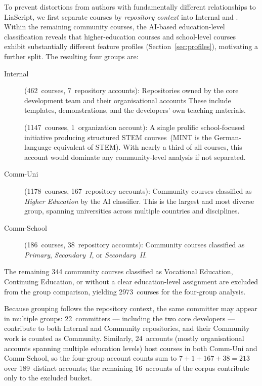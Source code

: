 To prevent distortions from authors with fundamentally different
relationships to LiaScript, we first separate courses by
\emph{repository context} into Internal and \mintgroup.
Within the remaining community courses, the AI-based education-level
classification reveals that higher-education courses and school-level
courses exhibit substantially different feature profiles
(Section~\ref{sec:profiles}), motivating a further split.
The resulting four groups are:
\begin{description}
  \item[Internal] (462~courses, 7~repository accounts):
    Repositories owned by the core development team and their
    organisational accounts
    These include templates, demonstrations, and the developers' own
    teaching materials.
  \item[\mintgroup] (\num{1147}~courses, 1~organization account):
    A single prolific school-focused initiative producing structured
    STEM courses\ifanonymous\else~(MINT is the German-language
    equivalent of STEM)\fi.
    With nearly a third of all courses, this account would dominate any
    community-level analysis if not separated.
  \item[Comm-Uni] (\num{1178}~courses, 167~repository accounts):
    Community courses classified as \emph{Higher Education} by the
    AI classifier.
    This is the largest and most diverse group, spanning universities
    across multiple countries and disciplines.
  \item[Comm-School] (186~courses, 38~repository accounts):
    Community courses classified as \emph{Primary}, \emph{Secondary~I},
    or \emph{Secondary~II}.
\end{description}

\noindent
The remaining \num{344} community courses classified as Vocational
Education, Continuing Education, or without a clear education-level
assignment are excluded from the group comparison, yielding
\num{2973}~courses for the four-group analysis.

Because grouping follows the repository context, the same committer
may appear in multiple groups: 22~committers --- including the two
core developers --- contribute to both Internal and Community
repositories, and their Community work is counted as Community.
Similarly, 24~accounts (mostly organisational accounts spanning
multiple education levels) host courses in both Comm-Uni and
Comm-School, so the four-group account counts sum to
$7+1+167+38=213$ over \num{189}~distinct accounts; the remaining
\num{16}~accounts of the corpus contribute only to the excluded
bucket.

